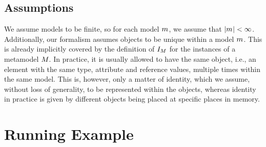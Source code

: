 \subsection{Assumptions}

We assume models to be finite, so for each model $m_{}$, we assume that $|m_{}| < \infty$.
Additionally, our formalism assumes objects to be unique within a model $m_{}$. 
This is already implicitly covered by the definition of $I_{M}$ for the instances of a metamodel $M_{}$. 
In practice, it is usually allowed to have the same object, i.e., an element with the same type, attribute and reference values, multiple times within the same model. 
This is, however, only a matter of identity, which we assume, without loss of generality, to be represented within the objects, whereas identity in practice is given by different objects being placed at specific places in memory.






\section{Running Example}

